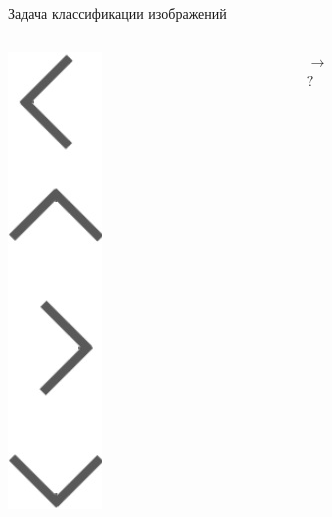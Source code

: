 \documentclass[aspectratio=169]{beamer}
\begin{document}
\begin{frame}{Задача классификации изображений}
\begin{columns}
\begin{column}{.07\linewidth}
            \includegraphics[width=\linewidth]{graphs/fig12_2.jpg}
        \end{column}
        \pause{}
        \begin{column}{.13\linewidth}
            \centering
            \( \longrightarrow  \) \\
            \( ? \)
        \end{column}
    \end{columns}
\end{frame}
\end{document}
